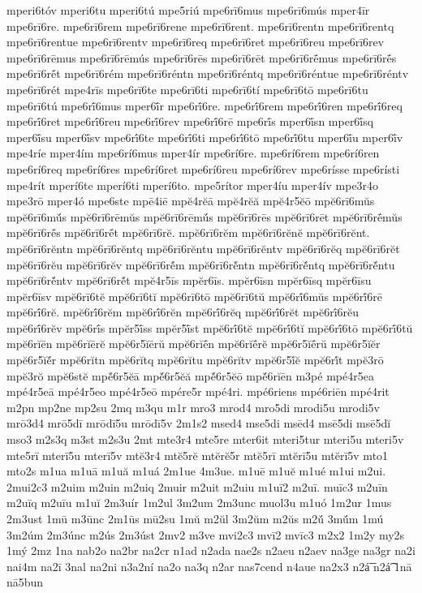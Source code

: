 {mperi6tóv
mperi6tu
mperi6tú
mpe5riú
mpe6rī6mus
mpe6rī6mús
mper4īr
mpe6rī6re.
mpe6rī6rem
mpe6rī6rene
mpe6rī6rent.
mpe6rī6rentn
mpe6rī6rentq
mpe6rī6rentue
mpe6rī6rentv
mpe6rī6req
mpe6rī6ret
mpe6rī6reu
mpe6rī6rev
mpe6rī6rēmus
mpe6rī6rēmús
mpe6rī6rēs
mpe6rī6rēt
mpe6rī6rḗmus
mpe6rī6rḗs
mpe6rī6rḗt
mpe6rī6rém
mpe6rī6réntn
mpe6rī6réntq
mpe6rī6réntue
mpe6rī6réntv
mpe6rī6rét
mpe4rīs
mpe6rī6te
mpe6rī6ti
mpe6rī6tí
mpe6rī6tō
mpe6rī6tu
mpe6rī6tú
mpe6rī́6mus
mper6ī́r
mpe6rī́6re.
mpe6rī́6rem
mpe6rī́6ren
mpe6rī́6req
mpe6rī́6ret
mpe6rī́6reu
mpe6rī́6rev
mpe6rī́6rē
mpe6rī́s
mper6ī́sn
mper6ī́sq
mper6ī́su
mper6ī́sv
mpe6rī́6te
mpe6rī́6ti
mpe6rī́6tō
mpe6rī́6tu
mper6ī́u
mper6ī́v
mpe4ríe
mper4ím
mpe6rí6mus
mper4ír
mpe6rí6re.
mpe6rí6rem
mpe6rí6ren
mpe6rí6req
mpe6rí6res
mpe6rí6ret
mpe6rí6reu
mpe6rí6rev
mpe6rísse
mpe6rísti
mpe4rít
mperí6te
mperí6ti
mperí6to.
mpe5rítor
mper4íu
mper4ív
mpe3r4o
mpe3rō
mper4ó
mpe6ste
mpē4iē
mpĕ4rĕā
mpĕ4rĕă
mpĕ4r5ĕō
mpĕ6rī6mŭs
mpĕ6rī6mŭ́s
mpĕ6rī6rēmŭs
mpĕ6rī6rēmŭ́s
mpĕ6rī6rēs
mpĕ6rī6rēt
mpĕ6rī6rḗmŭs
mpĕ6rī6rḗs
mpĕ6rī6rḗt
mpĕ6rī6rĕ.
mpĕ6rī6rĕm
mpĕ6rī6rĕnĕ
mpĕ6rī6rĕnt.
mpĕ6rī6rĕntn
mpĕ6rī6rĕntq
mpĕ6rī6rĕntu
mpĕ6rī6rĕntv
mpĕ6rī6rĕq
mpĕ6rī6rĕt
mpĕ6rī6rĕu
mpĕ6rī6rĕv
mpĕ6rī6rĕ́m
mpĕ6rī6rĕ́ntn
mpĕ6rī6rĕ́ntq
mpĕ6rī6rĕ́ntu
mpĕ6rī6rĕ́ntv
mpĕ6rī6rĕ́t
mpĕ4r5īs
mpĕr6īs.
mpĕr6īsn
mpĕr6īsq
mpĕr6īsu
mpĕr6īsv
mpĕ6rī6tĕ
mpĕ6rī6tĭ
mpĕ6rī6tō
mpĕ6rī6tŭ
mpĕ6rī́6mŭs
mpĕ6rī́6rē
mpĕ6rī́6rĕ.
mpĕ6rī́6rĕm
mpĕ6rī́6rĕn
mpĕ6rī́6rĕq
mpĕ6rī́6rĕt
mpĕ6rī́6rĕu
mpĕ6rī́6rĕv
mpĕ6rī́s
mpĕr5ī́ss
mpĕr5ī́st
mpĕ6rī́6tĕ
mpĕ6rī́6tĭ
mpĕ6rī́6tō
mpĕ6rī́6tŭ
mpĕ6rĭēn
mpĕ6rĭērĕ
mpĕ6r5ĭērŭ
mpĕ6rĭḗn
mpĕ6rĭḗrĕ
mpĕ6r5ĭḗrŭ
mpĕ6r5ĭĕr
mpĕ6r5ĭĕ́r
mpĕ6rĭtn
mpĕ6rĭtq
mpĕ6rĭtu
mpĕ6rĭtv
mpĕ6r5ĭ́ĕ
mpĕ6rĭ́t
mpĕ3rō
mpĕ3rŏ
mpĕ6stĕ
mpĕ́6r5ĕā
mpĕ́6r5ĕă
mpĕ́6r5ĕō
mpĕ́6rĭēn
m3pé
mpé4r5ea
mpé4r5eā
mpé4r5eo
mpé4r5eō
mpére5r
mpé4ri.
mpé6riens
mpé6riēn
mpé4rit
m2pn
mp2ne
mp2su
2mq
m3qu
m1r
mro3
mrod4
mro5di
mrodi5u
mrodi5v
mrō3d4
mrō5dī
mrōdī5u
mrōdī5v
2m1s2
msed4
mse5di
msēd4
msē5di
msē5dĭ
mso3
m2s3q
m3st
m2s3u
2mt
mte3r4
mte5re
mter6it
mteri5tur
mteri5u
mteri5v
mte5rī
mterī5u
mterī5v
mtĕ3r4
mtĕ5rĕ
mtĕrĕ5r
mtĕ5rī
mtĕrī5u
mtĕrī5v
mto1
mto2s
m1ua
m1uā
m1uă
m1uá
2m1ue
4m3ue.
m1uē
m1uĕ
m1ué
m1ui
m2ui.
2mui2c3
m2uim
m2uin
m2uiq
2muir
m2uit
m2uiu
m1uī2
m2uī.
muīc3
m2uīn
m2uīq
m2uīu
m1uĭ
2m3uír
1m2ul
3m2um
2m3unc
muol3u
m1uó
1m2ur
1mus
2m3ust
1mū
m3ūnc
2m1ūs
mū2su
1mŭ
m2ŭl
3m2ŭm
m2ŭs
m2ŭ́
3mŭ́m
1mú
3m2úm
2m3únc
m2ús
2m3úst
2mv2
m3ve
mvi2c3
mvī2
mvīc3
m2x2
1m2y
my2s
1mý
2mz
1na
nab2o
na2br
na2cr
n1ad
n2ada
nae2s
n2aeu
n2aev
na3ge
na3gr
na2i
nai4m
na2ī
3nal
na2ni
n3a2ní
na2o
na3q
n2ar
nas7cend
n4aue
na2x3
n2á͞
n2á͡
1nā
nā5bun
}
